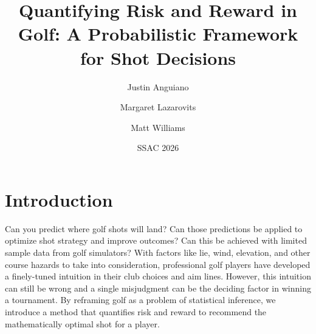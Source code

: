 \documentclass[11pt,a4paper]{article}
\title{Quantifying Risk and Reward in Golf: A Probabilistic Framework for Shot Decisions}
\author[1]{Justin Anguiano}
\author[1]{Margaret Lazarovits}
\author[2]{Matt Williams}
\affil[1]{Department of Physics, University of Kansas}
\affil[2]{Noonan Caddie}
\date{SSAC 2026}
\begin{document}
\maketitle

\section{Introduction}
Can you predict where golf shots will land? Can those predictions be applied to optimize shot strategy and improve outcomes? Can this be achieved with limited sample data from golf simulators? With factors like lie, wind, elevation, and other course hazards to take into consideration, professional golf players have developed a finely-tuned intuition in their club choices and aim lines. However, this intuition can still be wrong and a single misjudgment can be the deciding factor in winning a tournament. By reframing golf as a problem of statistical inference, we introduce a method that quantifies risk and reward to recommend the mathematically optimal shot for a player.

\end{document}
